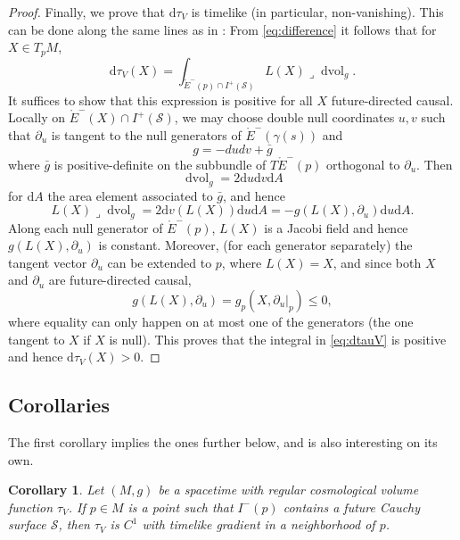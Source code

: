 \documentclass[a4paper,11pt]{amsart}
\newtheorem{corollary}[theorem]{{Corollary}}%
\newcommand{\vol}{\operatorname{dvol}_g}
\newcommand{\CS}{\mathcal{S}}
\newcommand{\df}{\mathrm{d}}
\begin{document}
\begin{proof}
 Finally, we prove that $\df \tau_V$ is timelike (in particular, non-vanishing). This can be done along the same lines as in \cite[p.~2810]{CGM16}: From \eqref{eq:difference} it follows that for $X \in T_pM$,
 \begin{equation} \label{eq:dtauV}
     \df \tau_V (X) = \int_{\mathring E^-(p) \cap I^+(\CS)} L(X) \lrcorner \vol.
 \end{equation}
 It suffices to show that this expression is positive for all $X$ future-directed causal. Locally on $\mathring E^-(X) \cap I^+(\CS)$, we may choose double null coordinates $u,v$ such that $\partial_u$ is tangent to the null generators of $\mathring E^-(\gamma(s))$ and
 \begin{equation*}
     g = -du dv + \bar g
 \end{equation*}
 where $\bar{g}$ is positive-definite on the subbundle of $T \mathring E^-(p)$ orthogonal to $\partial_u$. Then
 \begin{equation*}
     \vol = 2 \df u \df v \df A
 \end{equation*}
 for $\df A$ the area element associated to $\bar{g}$, and hence
 \begin{equation*}
     L(X) \lrcorner \vol = 2 \df v(L(X)) \df u \df A = -g(L(X),\partial_u) \df u \df A.
 \end{equation*}
 Along each null generator of $\mathring E^-(p)$, $L(X)$ is a Jacobi field and hence $g(L(X),\partial_u)$ is constant. Moreover, (for each generator separately) the tangent vector $\partial_u$ can be extended to $p$, where $L(X) = X$, and since both $X$ and $\partial_u$ are future-directed causal,
 \begin{equation*}
     g(L(X),\partial_u) = g_p(X,\partial_u \vert_p) \leq 0,
 \end{equation*}
 where equality can only happen on at most one of the generators (the one tangent to $X$ if $X$ is null). This proves that the integral in \eqref{eq:dtauV} is positive and hence $\df \tau_V(X) > 0$.
\end{proof}

\subsection{Corollaries}

The first corollary implies the ones further below, and is also interesting on its own.

\begin{corollary} \label{cor:2}
    Let $(M,g)$ be a spacetime with regular cosmological volume function $\tau_V$. If $p \in M$ is a point such that $I^-(p)$ contains a future Cauchy surface $\CS$, then $\tau_V$ is $C^1$ with timelike gradient in a neighborhood of $p$.
\end{corollary}
\end{document}
